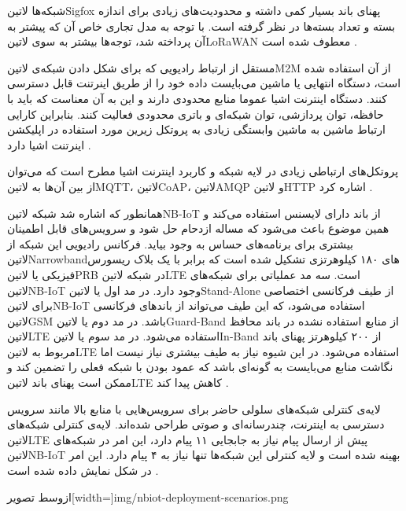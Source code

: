 شبکه‌ها ‌لاتین{Sigfox} پهنای باند بسیار کمی داشته و محدودیت‌های زیادی برای اندازه بسته و تعداد بسته‌ها در نظر گرفته است. با توجه به مدل تجاری خاص آن که پیشتر
به آن پرداخته شد، توجه‌ها بیشتر به سوی ‌لاتین{LoRaWAN} معطوف شده است
.

مستقل از ارتباط رادیویی که برای شکل دادن شبکه‌ی ‌لاتین{M2M} از آن استفاده شده است، دستگاه انتهایی یا ماشین می‌بایست داده خود را از طریق اینرتنت قابل دسترسی کنند.
دستگاه اینترنت اشیا عموما منابع محدودی دارند و این به آن معناست که باید با حافظه، توان پردازشی، توان شبکه‌ای و باتری محدودی فعالیت کنند.
بنابراین کارایی ارتباط ماشین به ماشین وابستگی زیادی به پروتکل زیرین مورد استفاده در اپلیکشن اینرتنت اشیا دارد
.

پروتکل‌های ارتباطی زیادی در لایه شبکه و کاربرد اینترنت اشیا مطرح است که می‌توان از بین آن‌ها به ‌لاتین{MQTT}، ‌لاتین{CoAP}، ‌لاتین{AMQP} و ‌لاتین{HTTP} اشاره کرد
.


همانطور که اشاره شد شبکه ‌لاتین{NB-IoT} از باند دارای لایسنس استفاده می‌کند و همین موضوع باعث می‌شود که مساله ازدحام حل شود و سرویس‌های
قابل اطمینان بیشتری برای برنامه‌های حساس به وجود بیاید.
فرکانس رادیویی این شبکه از ‌لاتین{Narrowband}های ۱۸۰ کیلوهرتزی تشکیل شده است که برابر با یک بلاک ریسورس فیزیکی یا ‌لاتین{PRB} در شبکه ‌لاتین{LTE} است.
سه مد عملیاتی برای شبکه‌های ‌لاتین{NB-IoT} وجود دارد.
در مد اول یا ‌لاتین{Stand-Alone} از طیف فرکانسی اختصاصی برای ‌لاتین{NB-IoT} استفاده می‌شود، که این طیف می‌تواند از باندهای فرکانسی ‌لاتین{GSM} باشد.
در مد دوم یا ‌لاتین{Guard-Band} از منابع استفاده نشده در باند محافظ ‌لاتین{LTE} استفاده می‌شود.
در مد سوم یا ‌لاتین{In-Band} از ۲۰۰ کیلوهرتز پهنای باند مربوط به ‌لاتین{LTE} استفاده می‌شود. در این شیوه نیاز به طیف بیشتری نیاز نیست اما نگاشت منابع می‌بایست به گونه‌ای باشد
که عمود بودن با شبکه فعلی را تضمین کند و ممکن است پهنای باند ‌لاتین{LTE} کاهش پیدا کند
.

لایه‌ی کنترلی شبکه‌های سلولی حاضر برای سرویس‌هایی با منابع بالا مانند سرویس دسترسی به اینترنت، چندرسانه‌ای و صوتی
طراحی شده‌اند.
لایه‌ی کنترلی شبکه‌های ‌لاتین{LTE} پیش از ارسال پیام نیاز به جابجایی ۱۱ پیام دارد، این امر در شبکه‌های ‌لاتین{NB-IoT}
بهینه شده است و لایه کنترلی این شبکه‌ها تنها نیاز به ۴ پیام دارد. این امر در شکل 
نمایش داده شده است
.

‌ازوسط
‌تصویر[width=\textwidth]{img/nbiot-deployment-scenarios.png}

